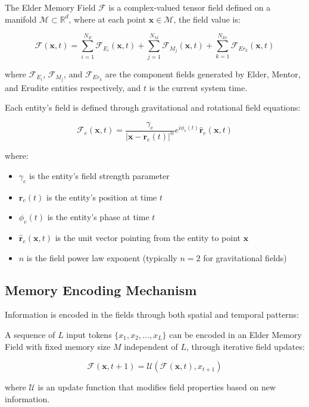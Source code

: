\begin{definition}
The Elder Memory Field $\mathcal{F}$ is a complex-valued tensor field defined on a manifold $\mathcal{M} \subset \mathbb{R}^d$, where at each point $\mathbf{x} \in \mathcal{M}$, the field value is:

\begin{equation}
\mathcal{F}(\mathbf{x}, t) = \sum_{i=1}^{N_E} \mathcal{F}_{E_i}(\mathbf{x}, t) + \sum_{j=1}^{N_M} \mathcal{F}_{M_j}(\mathbf{x}, t) + \sum_{k=1}^{N_{Er}} \mathcal{F}_{Er_k}(\mathbf{x}, t)
\end{equation}

where $\mathcal{F}_{E_i}$, $\mathcal{F}_{M_j}$, and $\mathcal{F}_{Er_k}$ are the component fields generated by Elder, Mentor, and Erudite entities respectively, and $t$ is the current system time.
\end{definition}

Each entity's field is defined through gravitational and rotational field equations:

\begin{equation}
\mathcal{F}_e(\mathbf{x}, t) = \frac{\gamma_e}{|\mathbf{x} - \mathbf{r}_e(t)|^n} e^{i\phi_e(t)} \hat{\mathbf{r}}_{e}(\mathbf{x}, t)
\end{equation}

where:
\begin{itemize}
    \item $\gamma_e$ is the entity's field strength parameter
    \item $\mathbf{r}_e(t)$ is the entity's position at time $t$
    \item $\phi_e(t)$ is the entity's phase at time $t$
    \item $\hat{\mathbf{r}}_{e}(\mathbf{x}, t)$ is the unit vector pointing from the entity to point $\mathbf{x}$
    \item $n$ is the field power law exponent (typically $n=2$ for gravitational fields)
\end{itemize}

\subsection{Memory Encoding Mechanism}

Information is encoded in the fields through both spatial and temporal patterns:

\begin{theorem}
A sequence of $L$ input tokens $\{x_1, x_2, ..., x_L\}$ can be encoded in an Elder Memory Field with fixed memory size $M$ independent of $L$, through iterative field updates:

\begin{equation}
\mathcal{F}(\mathbf{x}, t+1) = \mathcal{U}(\mathcal{F}(\mathbf{x}, t), x_{t+1})
\end{equation}

where $\mathcal{U}$ is an update function that modifies field properties based on new information.
\end{theorem}

